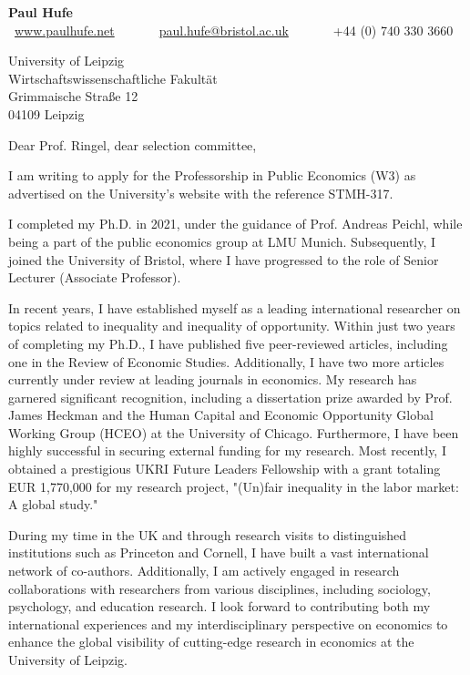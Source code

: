 \documentclass[11pt, a4paper]{letter}
\date{}
\begin{document}
\begin{center}
{\LARGE \centering \textbf{Paul Hufe}}\\
{\small \faMousePointer~\href{https://www.paulhufe.net}{www.paulhufe.net}~~~~~~\faEnvelope~\href{mailto:paul.hufe@bristol.ac.uk}{paul.hufe@bristol.ac.uk}~~~~~~\faPhone~+44 (0) 740 330 3660}
\end{center}

\begingroup
\let\clearpage\relax
\let\cleardoublepage\relax
\let\newpage\relax
\vspace{1cm}

\begin{letter}{University of Leipzig \\ Wirtschaftswissenschaftliche Fakultät \\ Grimmaische Straße 12 \\ 04109 Leipzig}


\opening{Dear Prof. Ringel, dear selection committee,}

I am writing to apply for the Professorship in Public Economics (W3) as advertised on the University's website with the reference STMH-317.

I completed my Ph.D. in 2021, under the guidance of Prof. Andreas Peichl, while being a part of the public economics group at LMU Munich. Subsequently, I joined the University of Bristol, where I have progressed to the role of Senior Lecturer (Associate Professor).

In recent years, I have established myself as a leading international researcher on topics related to inequality and inequality of opportunity. Within just two years of completing my Ph.D., I have published five peer-reviewed articles, including one in the Review of Economic Studies. Additionally, I have two more articles currently under review at leading journals in economics. My research has garnered significant recognition, including a dissertation prize awarded by Prof. James Heckman and the Human Capital and Economic Opportunity Global Working Group (HCEO) at the University of Chicago. Furthermore, I have been highly successful in securing external funding for my research. Most recently, I obtained a prestigious UKRI Future Leaders Fellowship with a grant totaling EUR 1,770,000 for my research project, "(Un)fair inequality in the labor market: A global study."

During my time in the UK and through research visits to distinguished institutions such as Princeton and Cornell, I have built a vast international network of co-authors. Additionally, I am actively engaged in research collaborations with researchers from various disciplines, including sociology, psychology, and education research. I look forward to contributing both my international experiences and my interdisciplinary perspective on economics to enhance the global visibility of cutting-edge research in economics at the University of Leipzig.


\end{letter}
\end{document}
